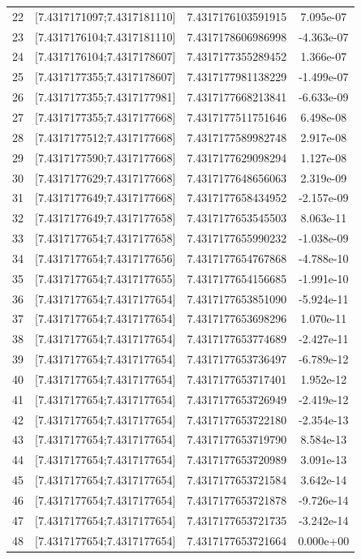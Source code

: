 \documentclass[11pt, oneside]{article}   	%
\begin{document}
\begin{center}
\begin{tabular}{ |c|c|c|c| }
 22 & [7.4317171097;7.4317181110] & 7.4317176103591915 &    7.095e-07 \\ 
 23 & [7.4317176104;7.4317181110] & 7.4317178606986998 &   -4.363e-07 \\ 
 24 & [7.4317176104;7.4317178607] & 7.4317177355289452 &    1.366e-07 \\ 
 25 & [7.4317177355;7.4317178607] & 7.4317177981138229 &   -1.499e-07 \\ 
 26 & [7.4317177355;7.4317177981] & 7.4317177668213841 &   -6.633e-09 \\ 
 27 & [7.4317177355;7.4317177668] & 7.4317177511751646 &    6.498e-08 \\ 
 28 & [7.4317177512;7.4317177668] & 7.4317177589982748 &    2.917e-08 \\ 
 29 & [7.4317177590;7.4317177668] & 7.4317177629098294 &    1.127e-08 \\ 
 30 & [7.4317177629;7.4317177668] & 7.4317177648656063 &    2.319e-09 \\ 
 31 & [7.4317177649;7.4317177668] & 7.4317177658434952 &   -2.157e-09 \\ 
 32 & [7.4317177649;7.4317177658] & 7.4317177653545503 &    8.063e-11 \\ 
 33 & [7.4317177654;7.4317177658] & 7.4317177655990232 &   -1.038e-09 \\ 
 34 & [7.4317177654;7.4317177656] & 7.4317177654767868 &   -4.788e-10 \\ 
 35 & [7.4317177654;7.4317177655] & 7.4317177654156685 &   -1.991e-10 \\ 
 36 & [7.4317177654;7.4317177654] & 7.4317177653851090 &   -5.924e-11 \\ 
 37 & [7.4317177654;7.4317177654] & 7.4317177653698296 &    1.070e-11 \\ 
 38 & [7.4317177654;7.4317177654] & 7.4317177653774689 &   -2.427e-11 \\ 
 39 & [7.4317177654;7.4317177654] & 7.4317177653736497 &   -6.789e-12 \\ 
 40 & [7.4317177654;7.4317177654] & 7.4317177653717401 &    1.952e-12 \\ 
 41 & [7.4317177654;7.4317177654] & 7.4317177653726949 &   -2.419e-12 \\ 
 42 & [7.4317177654;7.4317177654] & 7.4317177653722180 &   -2.354e-13 \\ 
 43 & [7.4317177654;7.4317177654] & 7.4317177653719790 &    8.584e-13 \\ 
 44 & [7.4317177654;7.4317177654] & 7.4317177653720989 &    3.091e-13 \\ 
 45 & [7.4317177654;7.4317177654] & 7.4317177653721584 &    3.642e-14 \\ 
 46 & [7.4317177654;7.4317177654] & 7.4317177653721878 &   -9.726e-14 \\ 
 47 & [7.4317177654;7.4317177654] & 7.4317177653721735 &   -3.242e-14 \\ 
 48 & [7.4317177654;7.4317177654] & 7.4317177653721664 &    0.000e+00 \\ 
  \hline
\end{tabular}
\end{center}
\end{document}
